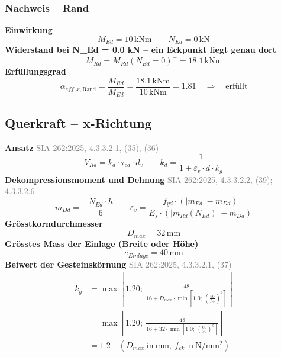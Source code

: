 \documentclass[11pt,a4paper]{article}
\newcommand{\normref}[1]{{\small\textcolor{gray}{#1}}}
\begin{document}
\subsubsection{Nachweis – Rand}
\noindent\textbf{Einwirkung}
\begin{equation*}
M_{Ed} = 10\,\mathrm{kNm} \qquad N_{Ed} = 0\,\mathrm{kN}
\end{equation*}
\noindent\textbf{Widerstand bei N\_Ed = 0.0 kN – ein Eckpunkt liegt genau dort}
\begin{equation*}
M_{Rd} = M_{Rd}(N_{Ed}=0)^{+} = 18.1\,\mathrm{kNm}
\end{equation*}
\noindent\textbf{Erfüllungsgrad}
\begin{equation*}
\alpha_{eff,x,\text{Rand}} = \frac{M_{Rd}}{M_{Ed}} = \frac{18.1\,\mathrm{kNm}}{10\,\mathrm{kNm}} = 1.81 \quad \Rightarrow \quad \text{erfüllt}
\end{equation*}
\subsection{Querkraft – x-Richtung}
\noindent\textbf{Ansatz} \hfill \normref{SIA 262:2025, 4.3.3.2.1, (35), (36)}
\begin{equation*}
V_{Rd} = k_d \cdot \tau_{cd} \cdot d_v \qquad k_d = \frac{1}{1 + \varepsilon_v \cdot d \cdot k_g}
\end{equation*}
\noindent\textbf{Dekompressionsmoment und Dehnung} \hfill \normref{SIA 262:2025, 4.3.3.2.2, (39); 4.3.3.2.6}
\begin{equation*}
m_{Dd} = -\frac{N_{Ed} \cdot h}{6} \qquad \varepsilon_v = \frac{f_{yd} \cdot \left(\left|m_{Ed}\right| - m_{Dd}\right)}{E_s \cdot \left(\left|m_{Rd}(N_{Ed})\right| - m_{Dd}\right)}
\end{equation*}
\noindent\textbf{Grösstkorndurchmesser}
\begin{equation*}
D_{max} = 32\,\mathrm{mm}
\end{equation*}
\noindent\textbf{Grösstes Mass der Einlage (Breite oder Höhe)}
\begin{equation*}
e_{Einlage} = 40\,\mathrm{mm}
\end{equation*}
\noindent\textbf{Beiwert der Gesteinskörnung} \hfill \normref{SIA 262:2025, 4.3.3.2.1, (37)}
\begin{equation*}
\begin{aligned}
  k_g &= \max\left[1.20;\ \frac{48}{16 + D_{max} \cdot \min\left[1.0;\ \left(\frac{60}{f_{ck}}\right)^{2}\right]}\right] \\
  &= \max\left[1.20;\ \frac{48}{16 + 32 \cdot \min\left[1.0;\ \left(\frac{60}{30}\right)^{2}\right]}\right] \\
  &= 1.2 \quad \left(D_{max}\ \text{in}\ \mathrm{mm},\ f_{ck}\ \text{in}\ \mathrm{N}/\mathrm{mm}^{2}\right)
\end{aligned}
\end{equation*}
\end{document}
